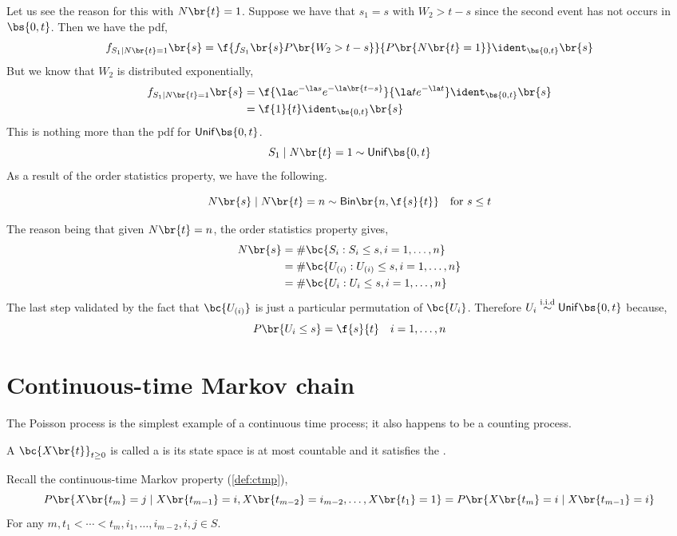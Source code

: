 \documentclass{article}
\newcommand{\Bi}{\mathsf{Bin}}
\newcommand{\Unif}{\mathsf{Unif}}
\begin{document}
    Let us see the reason for this with $N\br{t} = 1$. Suppose we have that $s_1 = s$ with $W_2 > t - s$ since the second event has not occurs in $\bs{0, t}$. Then we have the pdf,
    \[ f_{S_1 \mid N\br{t} = 1} \br{s} = \f{f_{S_1}\br{s} P\br{W_2 > t - s}}{P\br{N\br{t} = 1}} \ident_{\bs{0, t}}\br{s} \]
    But we know that $W_2$ is distributed exponentially,
    \begin{align*}
    f_{S_1 \mid N\br{t} = 1} \br{s}
    &= \f{ \la e^{-\la s} e^{-\la\br{t - s}}}{\la t e^{-\la t}} \ident_{\bs{0, t}}\br{s} \\
    &= \f{1}{t}\ident_{\bs{0, t}}\br{s}
    \end{align*}
    This is nothing more than the pdf for $\Unif\bs{0, t}$.
    \[ S_1 \mid N\br{t} = 1 \sim \Unif\bs{0, t} \]
    As a result of the order statistics property, we have the following.
    \begin{theorem}
        \[ N\br{s} \mid N\br{t} = n \sim \Bi\br{n, \f{s}{t}} \quad \text{for } s \leq t\]
    \end{theorem}
    The reason being that given $N\br{t} = n$, the order statistics property gives,
    \begin{align*}
        N\br{s}
        &= \# \bc{S_i : S_i \leq s, i = 1, \ldots, n} \\
        &= \# \bc{U_{(i)} : U_{(i)} \leq s, i = 1, \ldots, n} \\
        &= \# \bc{U_{i} : U_{i} \leq s, i = 1, \ldots, n}
    \end{align*}
    The last step validated by the fact that $\bc{U_{(i)}}$ is just a particular permutation of $\bc{U_{i}}$. Therefore $U_i \stackrel{\text{i.i.d}}{\sim} \Unif\bs{0, t}$ because,
    \[ P\br{U_i \leq s} = \f{s}{t} \quad i = 1, \ldots, n \]

    \section{Continuous-time Markov chain}

    The Poisson process is the simplest example of a continuous time process; it also happens to be a counting process.
    \begin{definition}
        A  $\bc{X\br{t}}_{t \geq 0}$ is called a  is its state space is at most countable and it satisfies the .
    \end{definition}
    Recall the continuous-time Markov property (\cref{def:ctmp}),
    \[ P\br{X\br{t_m} = j \mid X\br{t_{m-1}} = i, X\br{t_{m-2}} = i_{m-2}, \ldots, X\br{t_1} = 1} = P\br{X\br{t_{m}} = i \mid X\br{t_{m-1}} = i} \]
    For any $m, t_1 < \cdots < t_m, i_1, \ldots, i_{m-2}, i, j \in S$. \\
\end{document}
